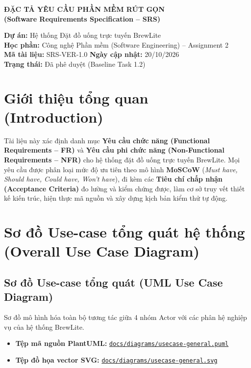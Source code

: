 \documentclass[12pt,a4paper]{article}
\begin{document}
\begin{center}
    {\LARGE \textbf{\textcolor{brandblue}{ĐẶC TẢ YÊU CẦU PHẦN MỀM RÚT GỌN}}}\\[0.3cm]
    {\large \textbf{(Software Requirements Specification -- SRS)}}\\[0.5cm]
    \begin{tcolorbox}[colback=lightgray,colframe=brandblue,arc=3mm,width=0.95\textwidth]
        \small
        \textbf{Dự án:} Hệ thống Đặt đồ uống trực tuyến BrewLite\\
        \textbf{Học phần:} Công nghệ Phần mềm (Software Engineering) -- Assignment 2\\
        \textbf{Mã tài liệu:} SRS-VER-1.0 \hfill \textbf{Ngày cập nhật:} 20/10/2026\\
        \textbf{Trạng thái:} Đã phê duyệt (Baseline Task 1.2)
    \end{tcolorbox}
\end{center}

\vspace{0.3cm}

\section{Giới thiệu tổng quan (Introduction)}
Tài liệu này xác định danh mục \textbf{Yêu cầu chức năng (Functional Requirements -- FR)} và \textbf{Yêu cầu phi chức năng (Non-Functional Requirements -- NFR)} cho hệ thống đặt đồ uống trực tuyến BrewLite. Mọi yêu cầu được phân loại mức độ ưu tiên theo mô hình \textbf{MoSCoW} (\textit{Must have, Should have, Could have, Won't have}), đi kèm các \textbf{Tiêu chí chấp nhận (Acceptance Criteria)} đo lường và kiểm chứng được, làm cơ sở truy vết thiết kế kiến trúc, hiện thực mã nguồn và xây dựng kịch bản kiểm thử tự động.

\section{Sơ đồ Use-case tổng quát hệ thống (Overall Use Case Diagram)}

\subsection{Sơ đồ Use-case tổng quát (UML Use Case Diagram)}
Sơ đồ mô hình hóa toàn bộ tương tác giữa 4 nhóm Actor với các phân hệ nghiệp vụ của hệ thống BrewLite.

\begin{itemize}[leftmargin=*,itemsep=1pt]
    \item \textbf{Tệp mã nguồn PlantUML:} \href{run:../diagrams/usecase-general.puml}{\texttt{docs/diagrams/usecase-general.puml}}
    \item \textbf{Tệp đồ họa vector SVG:} \href{run:../diagrams/usecase-general.svg}{\texttt{docs/diagrams/usecase-general.svg}}
\end{itemize}
\end{document}
